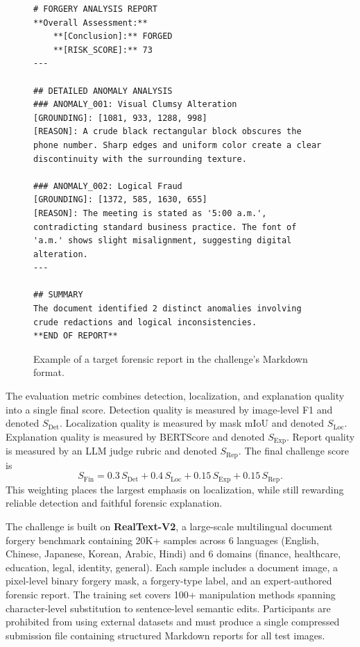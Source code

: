 \documentclass[sigconf, screen, review, anonymous]{acmart}
\begin{document}
\begin{figure}[h]
\centering
\begin{tcolorbox}[
  colback=codegray,
  colframe=black!75,
  arc=2pt,
  boxrule=0.5pt,
  left=4pt,
  right=4pt,
  top=4pt,
  bottom=4pt
]
\begin{lstlisting}[style=reportcode]
# FORGERY ANALYSIS REPORT
**Overall Assessment:**
    **[Conclusion]:** FORGED
    **[RISK_SCORE]:** 73
---

## DETAILED ANOMALY ANALYSIS
### ANOMALY_001: Visual Clumsy Alteration
[GROUNDING]: [1081, 933, 1288, 998]
[REASON]: A crude black rectangular block obscures the phone number. Sharp edges and uniform color create a clear discontinuity with the surrounding texture.

### ANOMALY_002: Logical Fraud
[GROUNDING]: [1372, 585, 1630, 655]
[REASON]: The meeting is stated as '5:00 a.m.', contradicting standard business practice. The font of 'a.m.' shows slight misalignment, suggesting digital alteration.
---

## SUMMARY
The document identified 2 distinct anomalies involving crude redactions and logical inconsistencies.
**END OF REPORT**
\end{lstlisting}
\end{tcolorbox}
\caption{Example of a target forensic report in the challenge's Markdown format.}
\label{fig:report_example}
\end{figure}

The evaluation metric combines detection, localization, and explanation quality into a single final score. Detection quality is measured by image-level F1 and denoted $S_{\text{Det}}$. Localization quality is measured by mask mIoU and denoted $S_{\text{Loc}}$. Explanation quality is measured by BERTScore and denoted $S_{\text{Exp}}$. Report quality is measured by an LLM judge rubric and denoted $S_{\text{Rep}}$. The final challenge score is
\begin{equation}
\label{eq:sfin}
S_{\text{Fin}} = 0.3\,S_{\text{Det}} + 0.4\,S_{\text{Loc}} + 0.15\,S_{\text{Exp}} + 0.15\,S_{\text{Rep}}.
\end{equation}
This weighting places the largest emphasis on localization, while still rewarding reliable detection and faithful forensic explanation.

The challenge is built on \textbf{RealText-V2}, a large-scale multilingual document forgery benchmark containing 20K+ samples across 6 languages (English, Chinese, Japanese, Korean, Arabic, Hindi) and 6 domains (finance, healthcare, education, legal, identity, general). Each sample includes a document image, a pixel-level binary forgery mask, a forgery-type label, and an expert-authored forensic report. The training set covers 100+ manipulation methods spanning character-level substitution to sentence-level semantic edits. Participants are prohibited from using external datasets and must produce a single compressed submission file containing structured Markdown reports for all test images.
\end{document}
